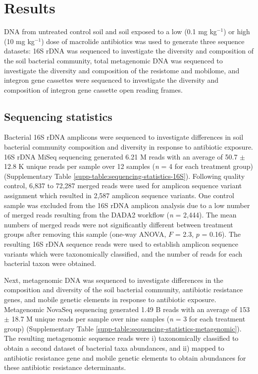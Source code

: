 \chapter{Results}

DNA from untreated control soil and soil exposed to a low (0.1 mg kg$^{-1}$) or high (10 mg kg$^{-1}$) dose of macrolide antibiotics was used to generate three sequence datasets:
16S rDNA was sequenced to investigate the diversity and composition of the soil bacterial community,
total metagenomic DNA was sequenced to investigate the diversity and composition of the resistome and mobilome,
and integron gene cassettes were sequenced to investigate the diversity and composition of integron gene cassette open reading frames.

\section{Sequencing statistics} \label{section:sequencing-statistics}

Bacterial 16S rDNA amplicons were sequenced to investigate differences in soil bacterial community composition and diversity in response to antibiotic exposure.
16S rDNA MiSeq sequencing generated 6.21 M reads with an average of 50.7 $\pm$ 12.8 K unique reads per sample over 12 samples  (\textit{n} = 4 for each treatment group) (Supplementary Table \ref{supp-table:sequencing-statistics-16S}).
Following quality control, 6,837 to 72,287 merged reads were used for amplicon sequence variant assignment which resulted in 2,587 amplicon sequence variants.
One control sample was excluded from the 16S rDNA amplicon analysis due to a low number of merged reads resulting from the DADA2 workflow  (\textit{n} = 2,444).
The mean numbers of merged reads were not significantly different between treatment groups after removing this sample (one-way ANOVA, $F$ = 2.3, $p$ = 0.16).
The resulting 16S rDNA sequence reads were used to establish amplicon sequence variants which were taxonomically classified, and the number of reads for each bacterial taxon were obtained.

Next, metagenomic DNA was sequenced to investigate differences in the composition and diversity of the soil bacterial community, antibiotic resistance genes, and mobile genetic elements in response to antibiotic exposure.
Metagenomic NovaSeq sequencing generated 1.49 B reads with an average of 153 $\pm$ 18.7 M unique reads per sample over nine samples (\textit{n} = 3 for each treatment group) (Supplementary Table \ref{supp-table:sequencing-statistics-metagenomic}).
The resulting metagenomic sequence reads were i) taxonomically classified to obtain a second dataset of bacterial taxa abundances, and ii) mapped to antibiotic resistance gene and mobile genetic elements to obtain abundances for these antibiotic resistance determinants.

